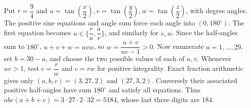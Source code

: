 Put $r = \dfrac{9}{4}$ and $u = \tan (\dfrac{x}{2}) , v = \tan (\dfrac{y}{2}) , w = \tan (\dfrac{z}{2})$, with degree angles. The positive sine equations and angle sum force each angle into $(0,180^\circ)$. The first equation becomes $u \in \{ \dfrac{r}{a} , \dfrac{a}{r} \}$, and similarly for $v,w$. Since the half-angles sum to $180^\circ$, $u+v+w=uvw$, so $w = \dfrac{u+v}{uv-1} > 0$. Now enumerate $a=1,\ldots,29$, set $b=30-a$, and choose the two possible values of each of $u,v$. Whenever $uv>1$, test $c = \dfrac{r}{w}$ and $c=rw$ for positive integrality. Exact fraction arithmetic gives only $(a,b,c)=(3,27,2)$ and $(27,3,2)$. Conversely their associated positive half-angles have sum $180^\circ$ and satisfy all equations. Thus $abc(a+b+c)=3\cdot27\cdot2\cdot32=5184$, whose last three digits are $\boxed{184}$.
